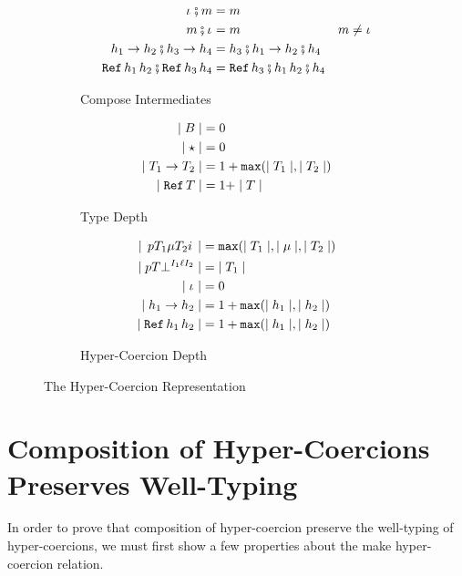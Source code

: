 \documentclass[acmtog, authorversion, acmlarge]{acmart}
\begin{document}
\begin{figure}[tbh]
\begin{subfigure}{.5\textwidth}
    \begin{align*}
      \cmpm{\id}{m} &= m\\
      \cmpm{m}{\id} &= m & m \neq \id \\
      \cmpm{\fn{\HC_1}{\HC_2}}{\fn{\HC_3}{\HC_4}} %
      &= \fn{\cmp{\HC_3}{\HC_1}}{\cmp{\HC_2}{\HC_4}}\\
      \cmpm{\rf{\HC_1}{\HC_2}}{\rf{\HC_3}{\HC_4}} %
      &= \rf{\cmp{\HC_3}{\HC_1}}{\cmp{\HC_2}{\HC_4}}\\ 
    \end{align*}
    \caption{Compose Intermediates}
    \label{fig:composeMed}
  \end{subfigure}
  \begin{subfigure}{.5\textwidth}
    \begin{align*}
      \mid B \mid &= 0 \\
      \mid \star \mid &= 0 \\
      \mid T_1  \to  T_2 \mid &= 1 + \texttt{max}(\mid T_1 \mid, \mid T_2 \mid)\\
      \mid \texttt{Ref} \, T \mid &= 1 + \mid T \mid
    \end{align*}
    \caption{Type Depth}
    \label{fig:tydepth}
  \end{subfigure}%
  \begin{subfigure}{.5\textwidth}
    \begin{align*}
      \depth{\hc{\Prj}{\T_1}{\Med}{\T_2}{\Inj}} %
      &= \Max{\depth{\T_1},\depth{\Med},\depth{\T_2}}\\
      \depth{\hcfail{\Prj}{\T}{\I_1}{\Lbl}{\I_2}} %
      &= \; \depth{\T_1} \\
      \depth{\id} &= 0\\
      \depth{\fn{\HC_1}{\HC_2}} &= 1 + \Max{\depth{\HC_1}, \depth{\HC_2}}\\
      \depth{\rf{\HC_1}{\HC_2}} &= 1 + \Max{\depth{\HC_1}, \depth{\HC_2}}
    \end{align*}
    \caption{Hyper-Coercion Depth}
    \label{fig:hcdepth}
    \end{subfigure}
  \caption{The Hyper-Coercion Representation}
  \label{fig:hc}
\end{figure}

\clearpage

\section{Composition of Hyper-Coercions Preserves Well-Typing}
\label{sec:well-typing}
In order to prove that composition of hyper-coercion preserve
the well-typing of hyper-coercions, we must first show a
few properties about the make hyper-coercion relation. 
\end{document}
